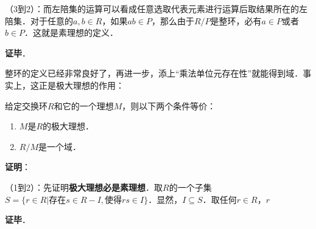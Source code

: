 （3到2）：而左陪集的运算可以看成任意选取代表元素进行运算后取结果所在的左陪集．对于任意的$a, b\in R$，如果$ab\in P$，那么由于$R/P$是整环，必有$a\in P$或者$b\in P$．这就是素理想的定义．

\textbf{证毕}．

整环的定义已经非常良好了，再进一步，添上“乘法单位元存在性”就能得到域．事实上，这正是极大理想的作用：

\begin{theorem}{}
给定交换环$R$和它的一个理想$M$，则以下两个条件等价：
\begin{enumerate}
\item $M$是$R$的极大理想．
\item $R/M$是一个域．
\end{enumerate}
\end{theorem}

\textbf{证明}：

（1到2）：先证明\textbf{极大理想必是素理想}．取$R$的一个子集$S=\{r\in R|\text{存在} s\in R-I, \text{使得}rs\in I\}$．显然，$I\subseteq S$．取任何$r\in R$，$r$

\textbf{证毕}．





